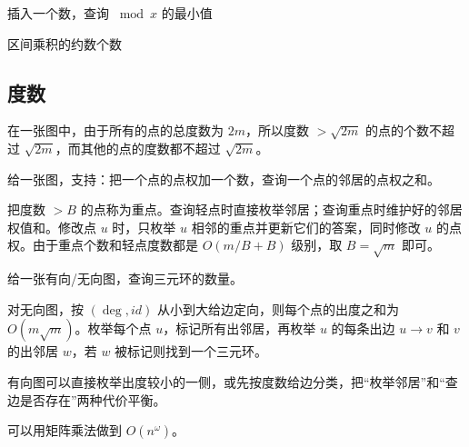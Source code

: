 \begin{example}[P9809]
    插入一个数，查询 $\bmod x$ 的最小值 
\end{example}

\begin{example}[P5071]
    区间乘积的约数个数
\end{example}

\subsection{度数}

在一张图中，由于所有的点的总度数为 $2m$，所以度数 $>\sqrt{2m}$ 的点的个数不超过 $\sqrt{2m}$，而其他的点的度数都不超过 $\sqrt{2m}$。

\begin{example}[单点加一圈和]
    给一张图，支持：把一个点的点权加一个数，查询一个点的邻居的点权之和。
\end{example}
\begin{solution}
    把度数 $>B$ 的点称为重点。查询轻点时直接枚举邻居；查询重点时维护好的邻居权值和。修改点 $u$ 时，只枚举 $u$ 相邻的重点并更新它们的答案，同时修改 $u$ 的点权。由于重点个数和轻点度数都是 $O(m/B+B)$ 级别，取 $B=\sqrt m$ 即可。
\end{solution}

\begin{example}[三元环计数]
    给一张有向/无向图，查询三元环的数量。
\end{example}
\begin{solution}
    对无向图，按 $(\deg,id)$ 从小到大给边定向，则每个点的出度之和为 $O(m\sqrt m)$。枚举每个点 $u$，标记所有出邻居，再枚举 $u$ 的每条出边 $u\to v$ 和 $v$ 的出邻居 $w$，若 $w$ 被标记则找到一个三元环。

    有向图可以直接枚举出度较小的一侧，或先按度数给边分类，把“枚举邻居”和“查边是否存在”两种代价平衡。
\end{solution}
\begin{remark}
    可以用矩阵乘法做到 $O(n^\omega)$。
\end{remark}

